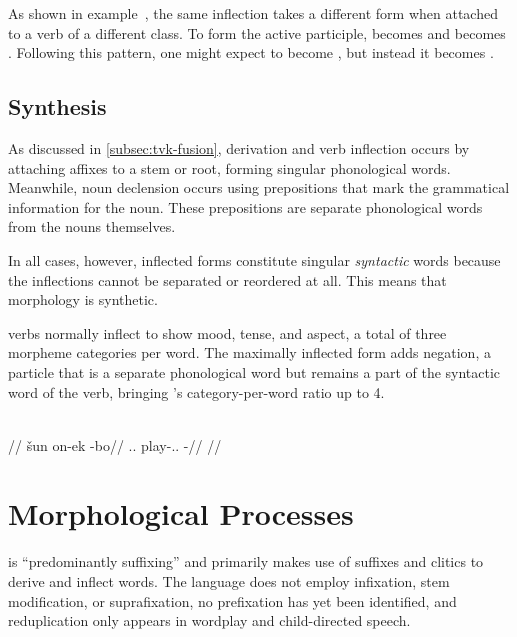 As shown in example~, the same inflection takes a different form when attached to a verb of a different class. To form the active participle,  becomes  and  becomes . Following this pattern, one might expect  to become \ungr{}, but instead it becomes .


\subsection{Synthesis}
\label{subsec:tvk-synthesis}

As discussed in \autoref{subsec:tvk-fusion}, derivation and verb inflection occurs by attaching affixes to a stem or root, forming singular phonological words. Meanwhile, noun declension occurs using prepositions that mark the grammatical information for the noun. These prepositions are separate phonological words from the nouns themselves.

In all cases, however, inflected forms constitute singular \emph{syntactic} words because the inflections cannot be separated or reordered at all. This means that \langtvk{} morphology is synthetic\autocite{wals-22}.

\langtvk{} verbs normally inflect to show mood, tense, and aspect, a total of three morpheme categories per word. The maximally inflected form adds negation, a particle that is a separate phonological word but remains a part of the syntactic word of the verb, bringing \langtvk's category-per-word ratio up to 4\autocite{wals-22}.

	\begingl
		\glpreamble{}\\
		//
		\gla šun on-ek -bo//
		\glb \Tps.\An.\Top{} play-\Ind.\Pst.\Pfv{} -\Neg//
		\glft {}//
	\endgl
\xe



\section{Morphological Processes}
\label{sec:tvk-processes}

\langtvk{} is \enquote{predominantly suffixing}\autocite{wals-26} and primarily makes use of suffixes and clitics to derive and inflect words. The language does not employ infixation, stem modification, or suprafixation, no prefixation has yet been identified, and reduplication only appears in wordplay and child-directed speech.

